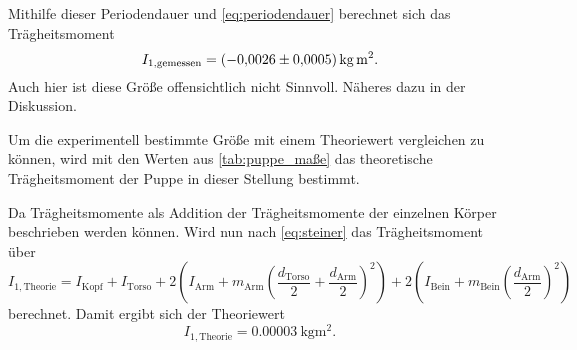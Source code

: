 Mithilfe dieser Periodendauer und \autoref{eq:periodendauer} berechnet sich das Trägheitsmoment
\begin{equation}
    I_{1,\text{gemessen}} = \SI{-0.0026+-0.0005}{\kilo\gram\meter\squared}.
\end{equation}
Auch hier ist diese Größe offensichtlich nicht Sinnvoll. Näheres dazu in der Diskussion.

Um die experimentell bestimmte Größe mit einem Theoriewert vergleichen zu können, wird mit den Werten aus \autoref{tab:puppe_maße} das theoretische Trägheitsmoment der Puppe in dieser Stellung bestimmt.

Da Trägheitsmomente als Addition der Trägheitsmomente der einzelnen Körper beschrieben werden können. Wird nun nach \autoref{eq:steiner} das Trägheitsmoment über
\begin{equation}
    I_{1,\text{Theorie}} = I_\text{Kopf} + I_\text{Torso} 
    + 2 \left( I_\text{Arm} + m_\text{Arm} \left(\frac{d_\text{Torso}}{2} + \frac{d_\text{Arm}}{2} \right)^2 \right)
    + 2 \left( I_\text{Bein} + m_\text{Bein} \left(\frac{d_\text{Arm}}{2}\right)^2 \right) 
\end{equation}
berechnet. Damit ergibt sich der Theoriewert
\begin{equation}
    I_{1,\text{Theorie}} = \SI{0.00003}{\kilo\gram\meter\squared}.
\end{equation}